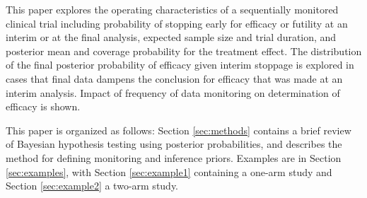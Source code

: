 \documentclass[useAMS,usenatbib,referee]{biom}
\begin{document}
This paper explores the operating characteristics of a sequentially monitored clinical trial including probability of stopping early for efficacy or futility at an interim or at the final analysis, expected sample size and trial duration, and posterior mean and coverage probability for the treatment effect. The distribution of the final posterior probability of efficacy given interim stoppage is explored in cases that final data dampens the conclusion for efficacy that was made at an interim analysis. Impact of frequency of data monitoring on determination of efficacy is shown.

This paper is organized as follows: Section \ref{sec:methods} contains a brief review of Bayesian hypothesis testing using posterior probabilities, and describes the method for defining monitoring and inference priors. Examples are in Section \ref{sec:examples}, with Section \ref{sec:example1} containing a one-arm study and Section \ref{sec:example2} a two-arm study.
\end{document}
